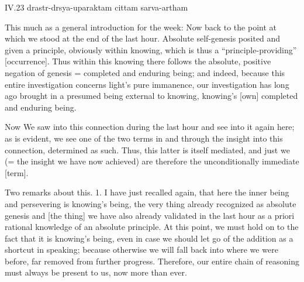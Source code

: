 IV.23
drastr-drsya-uparaktam cittam sarva-artham

This much as a general introduction for the week:
Now back to the point at which we stood at the end of the last hour.
Absolute self-genesis posited and given a principle,
obviously within knowing,
which is thus a “principle-providing” [occurrence].
Thus within this knowing there follows
the absolute, positive negation of genesis =
completed and enduring being;
and indeed, because this entire investigation
concerns light's pure immanence,
our investigation has long ago brought in
a presumed being external to knowing,
knowing's [own] completed and enduring being.

Now We saw into this connection during the last hour
and see into it again here;
as is evident, we see one of the two terms
in and through the insight into this connection,
determined as such.
Thus, this latter is itself mediated,
and just we (= the insight we have now achieved) are
therefore the unconditionally immediate [term].

Two remarks about this.
1. I have just recalled again,
that here the inner being and persevering is knowing's being,
the very thing already recognized as absolute genesis
and [the thing] we have also already validated in the last hour
as a priori rational knowledge of an absolute principle.
At this point, we must hold on to
the fact that it is knowing's being,
even in case we should let go of
the addition as a shortcut in speaking;
because otherwise we will fall back into
where we were before, far removed from further progress.
Therefore, our entire chain of reasoning
must always be present to us, now more than ever.

